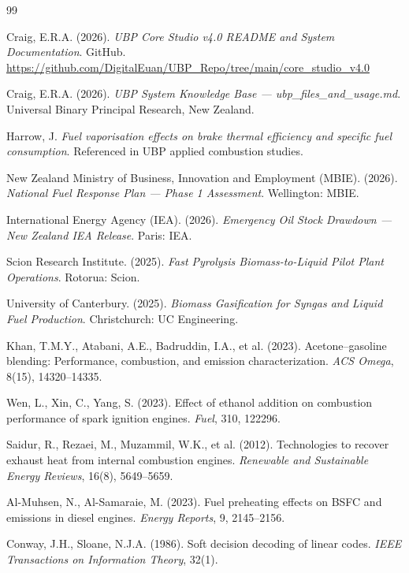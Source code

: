\documentclass[12pt,a4paper]{article}
\begin{document}
\begin{thebibliography}{99}

Craig, E.R.A. (2026). \textit{UBP Core Studio v4.0 README and System Documentation}.
GitHub. \url{https://github.com/DigitalEuan/UBP_Repo/tree/main/core_studio_v4.0}

Craig, E.R.A. (2026). \textit{UBP System Knowledge Base --- ubp\_files\_and\_usage.md}.
Universal Binary Principal Research, New Zealand.

Harrow, J. \textit{Fuel vaporisation effects on brake thermal efficiency and specific
fuel consumption}. Referenced in UBP applied combustion studies.

New Zealand Ministry of Business, Innovation and Employment (MBIE). (2026).
\textit{National Fuel Response Plan --- Phase 1 Assessment}. Wellington: MBIE.

International Energy Agency (IEA). (2026).
\textit{Emergency Oil Stock Drawdown --- New Zealand IEA Release}. Paris: IEA.

Scion Research Institute. (2025).
\textit{Fast Pyrolysis Biomass-to-Liquid Pilot Plant Operations}. Rotorua: Scion.

University of Canterbury. (2025).
\textit{Biomass Gasification for Syngas and Liquid Fuel Production}.
Christchurch: UC Engineering.

Khan, T.M.Y., Atabani, A.E., Badruddin, I.A., et al. (2023).
Acetone--gasoline blending: Performance, combustion, and emission characterization.
\textit{ACS Omega}, 8(15), 14320--14335.

Wen, L., Xin, C., Yang, S. (2023).
Effect of ethanol addition on combustion performance of spark ignition engines.
\textit{Fuel}, 310, 122296.

Saidur, R., Rezaei, M., Muzammil, W.K., et al. (2012).
Technologies to recover exhaust heat from internal combustion engines.
\textit{Renewable and Sustainable Energy Reviews}, 16(8), 5649--5659.

Al-Muhsen, N., Al-Samaraie, M. (2023).
Fuel preheating effects on BSFC and emissions in diesel engines.
\textit{Energy Reports}, 9, 2145--2156.

Conway, J.H., Sloane, N.J.A. (1986).
Soft decision decoding of linear codes.
\textit{IEEE Transactions on Information Theory}, 32(1).


\end{thebibliography}
\end{document}
